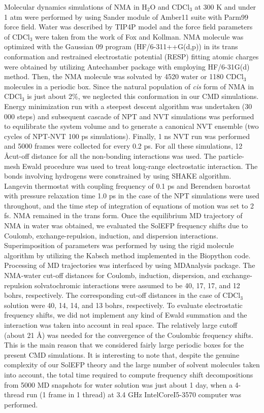 \documentclass[a4paper,titlepage,twoside,fleqn,12pt]{book}
\begin{document}
\begin{appendices}
\begin{refsection}
Molecular dynamics simulations of NMA in H$_2$O and
CDCl$_3$ at 300 K and under 1 atm were performed by using
Sander module of {\sc Amber11} suite%
with Parm99 force field.%
Water was described by TIP4P model%
and the force field
parameters of CDCl$_3$ were taken from the work of Fox and
Kollman.%
NMA molecule was optimized with the {\sc Gaussian 09}
program (HF/6-311++G(d,p)) in its trans conformation
and restrained electrostatic potential (RESP) fitting atomic
charges%
were obtained by utilizing {\sc Antechamber} package%
with employing HF/6-31G(d) method.%
Then, the NMA
molecule was solvated by 4520 water or 1180 CDCl$_3$
molecules in a periodic box. Since the natural population of
\emph{cis} form of NMA in CDCl$_3$ is just about 2\%, we neglected this
conformation in our CMD simulations.%
Energy minimization
run with a steepest descent algorithm was undertaken (30 000
steps) and subsequent cascade of NPT and NVT simulations
was performed to equilibrate the system volume and to
generate a canonical NVT ensemble (two cycles of NPT\hyp{}NVT
100 ps simulations). Finally, 1 ns NVT run was performed
and 5000 frames were collected for every 0.2 ps. For all these
simulations, 12 \AA cut\hyp{}off distance for all the non-bonding
interactions was used. The particle\hyp{}mesh Ewald procedure%
was used to treat long\hyp{}range electrostatic interaction. The
bonds involving hydrogens were constrained by using SHAKE
algorithm.%
Langevin thermostat%
with coupling frequency
of 0.1 ps and Berendsen barostat%
with pressure relaxation
time 1.0 ps in the case of the NPT simulations were used
throughout, and the time step of integration of equations of
motion was set to 2 fs. NMA remained in the trans form.
Once the equilibrium MD trajectory of NMA in water
was obtained, we evaluated the SolEFP frequency shifts due
to Coulomb, exchange\hyp{}repulsion, induction, and dispersion
interactions. Superimposition of parameters was performed by
using the rigid molecule algorithm%
by utilizing the Kabsch
method%
implemented in the {\sc Biopython} code.%
Processing
of MD trajectories was interfaced by using MDAnalysis
package.%
The NMA\hyp{}water cut\hyp{}off distances for Coulomb,
induction, dispersion, and exchange\hyp{}repulsion solvatochromic
interactions were assumed to be 40, 17, 17, and 12 bohrs,
respectively. The corresponding cut\hyp{}off distances in the case of
CDCl$_3$ solution were 40, 14, 14, and 13 bohrs, respectively. To
evaluate electrostatic frequency shifts, we did not implement
any kind of Ewald summation and the interaction was taken
into account in real space. The relatively large cutoff (about
21 \AA) was needed for the convergence of the Coulombic
frequency shifts. This is the main reason that we considered
fairly large periodic boxes for the present CMD simulations. It is
interesting to note that, despite the genuine complexity of our
SolEFP theory and the large number of solvent molecules
taken into account, the total time required to compute
frequency shift decompositions from 5000 MD snapshots for
water solution was just about 1 day, when a 4\hyp{}thread run (1
frame in 1 thread) at 3.4 GHz Intel\textregistered Core\texttrademark I5\hyp{}3570 computer
was performed.



\end{refsection}
\end{appendices}
\end{document}
